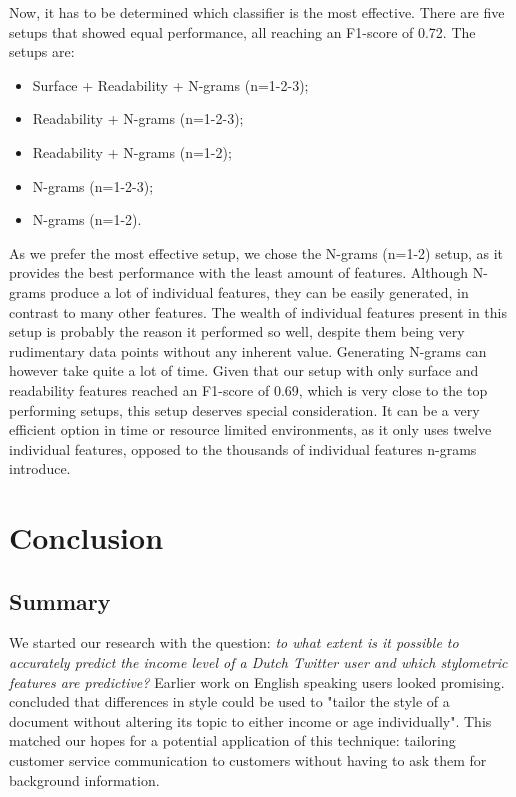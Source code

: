 \documentclass[
10pt, %
a4paper, %
oneside, %
headinclude,footinclude, %
] {book}%
\begin{document}

Now, it has to be determined which classifier is the most effective. There are five setups that showed equal performance, all reaching an F1-score of 0.72. The setups are:
\begin{itemize}
\item Surface + Readability + N-grams (n=1-2-3);
\item Readability + N-grams (n=1-2-3);
\item Readability + N-grams (n=1-2);
\item N-grams (n=1-2-3);
\item N-grams (n=1-2).
\end{itemize}

As we prefer the most effective setup, we chose the N-grams (n=1-2) setup, as it provides the best performance with the least amount of features. Although N-grams produce a lot of individual features, they can be easily generated, in contrast to many other features. The wealth of individual features present in this setup is probably the reason it performed so well, despite them being very rudimentary data points without any inherent value.
Generating N-grams can however take quite a lot of time. Given that our setup with only surface and readability features reached an F1-score of 0.69, which is very close to the top performing setups, this setup deserves special consideration. It can be a very efficient option in time or resource limited environments, as it only uses twelve individual features, opposed to the thousands of individual features n-grams introduce.


\chapter{Conclusion}
\label{conclusion}
\section{Summary}
We started our research with the question: \textit{to what extent is it possible to accurately predict the income level of a Dutch Twitter user and which stylometric features are predictive?} Earlier work on English speaking users looked promising. \citet{flekova} concluded that differences in style could be used to "tailor the style of a document without altering its topic to either income or age individually". This matched our hopes for a potential application of this technique: tailoring customer service communication to customers without having to ask them for background information.
\end{document}
